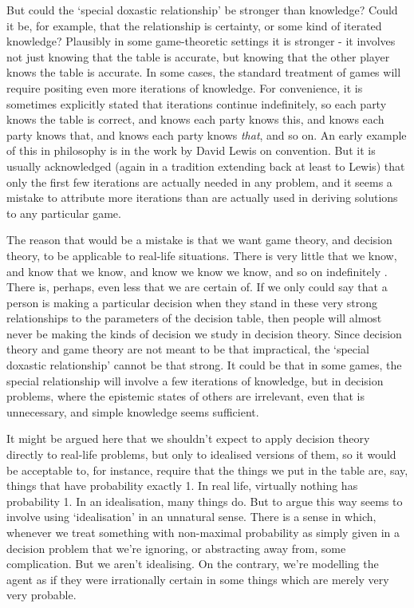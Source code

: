 \documentclass[
  11pt,
]{book}
\begin{document}
But could the `special doxastic relationship' be stronger than knowledge? Could it be, for example, that the relationship is certainty, or some kind of iterated knowledge? Plausibly in some game-theoretic settings it is stronger - it involves not just knowing that the table is accurate, but knowing that the other player knows the table is accurate. In some cases, the standard treatment of games will require positing even more iterations of knowledge. For convenience, it is sometimes explicitly stated that iterations continue indefinitely, so each party knows the table is correct, and knows each party knows this, and knows each party knows that, and knows each party knows \emph{that}, and so on. An early example of this in philosophy is in the work by David Lewis \citeyearpar{Lewis1969a} on convention. But it is usually acknowledged (again in a tradition extending back at least to Lewis) that only the first few iterations are actually needed in any problem, and it seems a mistake to attribute more iterations than are actually used in deriving solutions to any particular game.

The reason that would be a mistake is that we want game theory, and decision theory, to be applicable to real-life situations. There is very little that we know, and know that we know, and know we know we know, and so on indefinitely \citep[Ch. 4]{Williamson2000}. There is, perhaps, even less that we are certain of. If we only could say that a person is making a particular decision when they stand in these very strong relationships to the parameters of the decision table, then people will almost never be making the kinds of decision we study in decision theory. Since decision theory and game theory are not meant to be that impractical, the `special doxastic relationship' cannot be that strong. It could be that in some games, the special relationship will involve a few iterations of knowledge, but in decision problems, where the epistemic states of others are irrelevant, even that is unnecessary, and simple knowledge seems sufficient.

It might be argued here that we shouldn't expect to apply decision theory directly to real-life problems, but only to idealised versions of them, so it would be acceptable to, for instance, require that the things we put in the table are, say, things that have probability exactly 1. In real life, virtually nothing has probability 1. In an idealisation, many things do. But to argue this way seems to involve using `idealisation' in an unnatural sense. There is a sense in which, whenever we treat something with non-maximal probability as simply given in a decision problem that we're ignoring, or abstracting away from, some complication. But we aren't idealising. On the contrary, we're modelling the agent as if they were irrationally certain in some things which are merely very very probable.
\end{document}
